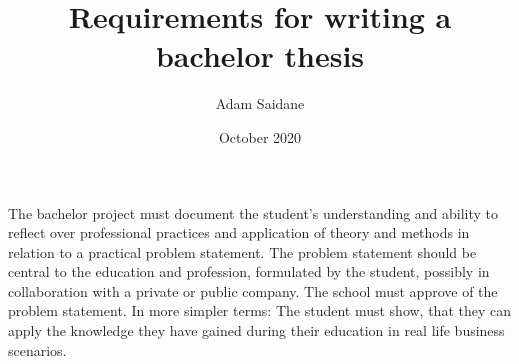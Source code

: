 \documentclass{article}
\begin{document}
\title{Requirements for writing a bachelor thesis}
\author{Adam Saidane}
\date{October 2020}
\maketitle
The bachelor project must document the student's understanding and ability to reflect over professional practices and application of theory and methods in relation to a practical problem statement. The problem statement should be central to the education and profession, formulated by the student, possibly in collaboration with a private or public company. The school must approve of the problem statement\cite[my translation]{curriculum}. In more simpler terms: The student must show, that they can apply the knowledge they have gained during their education in real life business scenarios.


\end{document}
